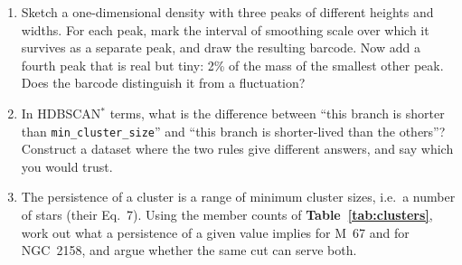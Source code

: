 \begin{issues}[EXERCISES]
\begin{enumerate}
\item Sketch a one-dimensional density with three peaks of different heights
and widths. For each peak, mark the interval of smoothing scale over which it
survives as a separate peak, and draw the resulting barcode. Now add a fourth
peak that is real but tiny: 2\% of the mass of the smallest other peak. Does
the barcode distinguish it from a fluctuation?
\item In HDBSCAN$^*$ terms, what is the difference between ``this branch is
  shorter than \texttt{min\_cluster\_size}'' and ``this branch is shorter-lived
  than the others''? Construct a dataset where the two rules give different
  answers, and say which you would trust.
\item The persistence of a cluster is a range of minimum cluster sizes, i.e.\
  a number of stars (their Eq.~7). Using the member counts of
  \textbf{Table~\ref{tab:clusters}}, work out what a persistence of a given
  value implies for M~67 and for NGC~2158, and argue whether the same cut can
  serve both.
\end{enumerate}
\end{issues}
